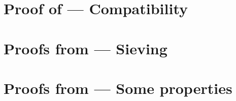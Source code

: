 \section{Proof of  --- Compatibility}
\label{compatibility_of_simulation_residuals_and_permutation_equivalence_proof}


\section{Proofs from  --- Sieving}
\label{sieving_proofs}


\section{Proofs from  --- Some properties}
\label{garbage_some_properties_proof}




